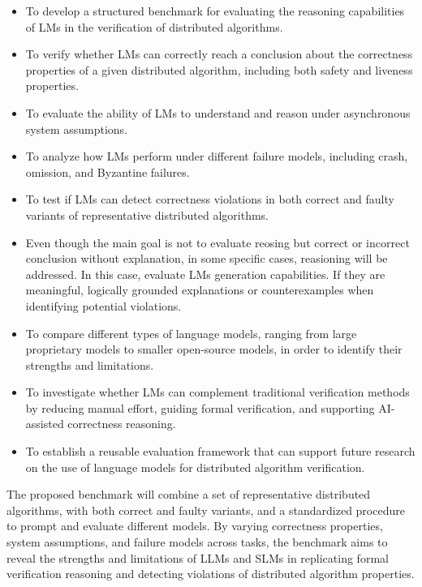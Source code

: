 \begin{itemize}
    \item To develop a structured benchmark for evaluating the reasoning capabilities of LMs in the verification of distributed algorithms.

    \item To verify whether LMs can correctly reach a conclusion about the correctness properties of a given distributed algorithm, including both safety and liveness properties.

    \item To evaluate the ability of LMs to understand and reason under asynchronous system assumptions.

    \item To analyze how LMs perform under different failure models, including crash, omission, and Byzantine failures.

    \item To test if LMs can detect correctness violations in both correct and faulty variants of representative distributed algorithms.

    \item Even though the main goal is not to evaluate reosing but correct or incorrect conclusion without explanation, in some specific cases, reasioning will be addressed. In this case, evaluate LMs generation capabilities. If they are meaningful, logically grounded explanations or counterexamples when identifying potential violations.

    \item To compare different types of language models, ranging from large proprietary models to smaller open-source models, in order to identify their strengths and limitations.

    \item To investigate whether LMs can complement traditional verification methods by reducing manual effort, guiding formal verification, and supporting AI-assisted correctness reasoning.

    \item To establish a reusable evaluation framework that can support future research on the use of language models for distributed algorithm verification.
\end{itemize}

The proposed benchmark will combine a set of representative distributed algorithms, with both correct and faulty variants, and a standardized procedure to prompt and evaluate different models. By varying correctness properties, system assumptions, and failure models across tasks, the benchmark aims to reveal the strengths and limitations of LLMs and SLMs in replicating formal verification reasoning and detecting violations of distributed algorithm properties.


